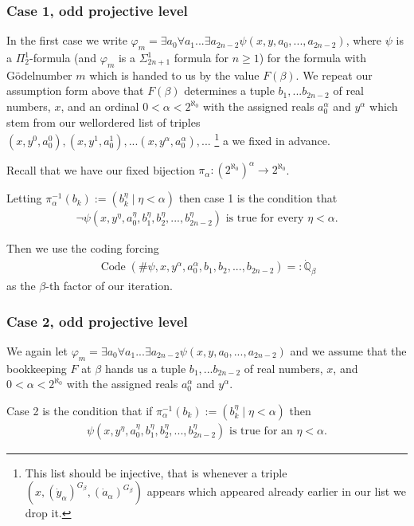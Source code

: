 \documentclass[a4paper,11pt]{article}
\newcommand{\forceQ}{\mathbb{Q}}
\begin{document}
\subsubsection{Case 1, odd projective level}

In the first case we write $\varphi_m= \exists a_0 \forall a_1... \exists a_{2n-2} \psi (x,y, a_0,...,a_{2n-2} )$, where $\psi$ is a $\Pi^1_2$-formula (and $\varphi_m$ is a 
$\Sigma^1_{2n+1}$ formula for $n \ge 1$) for the formula with G\"odelnumber $m$ which is handed to us by the value $F(\beta)$.
We repeat our assumption form above that $F(\beta)$ determines
a tuple $b_1,...b_{2n-2}$ of real numbers, $x$, and an ordinal $0<\alpha< 2^{\aleph_0}$ with the assigned reals $a_0^{\alpha}$ and $y^{\alpha}$ which stem from our wellordered list of triples $(x,y^0,a_0^0), (x,y^1, a_0^1),...(x,y^{\alpha},a_0^{\alpha}),...$ \footnote{This list should be injective, that is whenever a triple  $(x,(\dot{y}_{\alpha})^{G_{\beta}},(\dot{a}_{\alpha})^{G_{\beta}})$ appears which appeared already earlier in our list we drop it.} a we fixed in advance.

Recall that we have our fixed bijection $\pi_{\alpha}:( 2^{\aleph_0})^{\alpha} \rightarrow 2^{\aleph_0}$.

Letting $\pi_{\alpha}^{-1} (b_k):= (b^{\eta}_k \mid \eta < \alpha)$ then case 1 is the condition that
\begin{align*}
\lnot \psi (x,y^{\eta},a_0^{\eta}, b_1^{\eta}, b_2^{\eta},...,b_{2n-2}^{\eta} ) \text{ is true for every $\eta < \alpha$.}
\end{align*}

Then we use the coding forcing
\begin{align*}
\operatorname{Code} (\# \psi,x,y^{\alpha},a_0^{\alpha}, b_1,b_2,...,b_{2n-2}) =: \dot{\forceQ}_{\beta}
\end{align*}
as the $\beta$-th factor of our iteration. 



\subsubsection{Case 2, odd projective level}
We again let $\varphi_m= \exists a_0 \forall a_1... \exists a_{2n-2} \psi (x,y, a_0,...,a_{2n-2} )$  and we assume that the bookkeeping $F$ at $\beta$ hands us
a tuple $b_1,...b_{2n-2}$ of real numbers, $x$, and $0<\alpha< 2^{\aleph_0}$ with the assigned reals $a_0^{\alpha}$ and $y^{\alpha}$. 

Case 2 is the condition that if $\pi_{\alpha}^{-1} (b_k):= (b^{\eta}_k \mid \eta < \alpha)$ then
\begin{align*}
 \psi (x,y^{\eta},a_0^{\eta}, b_1^{\eta}, b_2^{\eta},...,b_{2n-2}^{\eta} ) \text{ is true for an $\eta < \alpha$.}
\end{align*}
\end{document}
